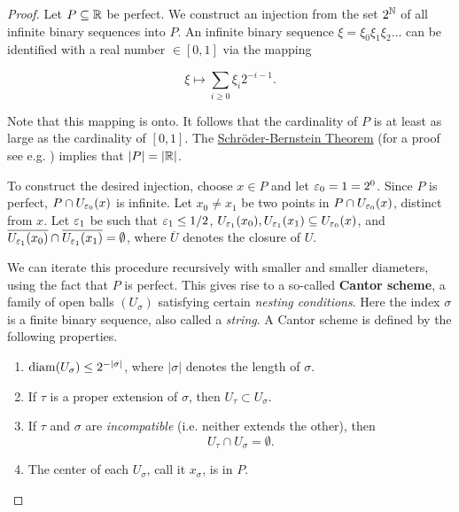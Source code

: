 \begin{proof}Let $P \subseteq \mathbb{R}$ be perfect. We construct an injection from the set $2^{\mathbb{N}}$ of all infinite binary sequences into $P$. An infinite binary sequence $\xi = \xi_0 \xi_1 \xi_2 \dots$ can be identified with a real number $\in [0,1]$ via the mapping

\begin{equation}
\xi \mapsto \sum_{i \geq 0} \xi_i 2^{-i-1}.
\end{equation}

Note that this mapping is onto. It follows that the cardinality of $P$ is at least as large as the cardinality of $[0,1]$. The \href{https://en.wikipedia.org/wiki/Schr\%C3\%B6der\%E2\%80\%93Bernstein\_theorem}{Schröder-Bernstein Theorem} (for a proof see e.g. \cite{jech2003a}) implies that $|P| = |\mathbb{R}|$.

To construct the desired injection, choose $x \in P$ and let $\varepsilon_0 = 1 = 2^0$. Since $P$ is perfect, $P \cap U_{\varepsilon_0}(x)$ is infinite. Let $x_0 \neq x_1$ be two points in $P \cap U_{\varepsilon_0}(x)$, distinct from $x$. Let $\varepsilon_1$ be such that $\varepsilon_1 \leq 1/2$, $U_{\varepsilon_1}(x_0), U_{\varepsilon_1}(x_1) \subseteq U_{\varepsilon_0}(x)$, and $\overline{U_{\varepsilon_1}(x_0)} \cap \overline{U_{\varepsilon_1}(x_1)} = \emptyset$, where $\overline{U}$ denotes the closure of $U$.

We can iterate this procedure recursively with smaller and smaller diameters, using the fact that $P$ is perfect. This gives rise to a so-called \textbf{Cantor scheme}, a family of open balls $(U_\sigma)$ satisfying certain \textit{nesting conditions}. Here the index $\sigma$ is a finite binary sequence, also called a \textit{string}. A Cantor scheme is defined by the following properties.

\begin{enumerate}
\item $\mathrm{diam}(U_\sigma) \leq 2^{ -|\sigma|}$, where $|\sigma|$ denotes the length of $\sigma$.
\item If $\tau$ is a proper extension of $\sigma$, then $U_\tau \subset U_\sigma$.
\item If $\tau$ and $\sigma$ are \textit{incompatible} (i.e. neither extends the other), then
\begin{equation*}
U_\tau \cap U_\sigma = \emptyset.
\end{equation*}

\item The center of each $U_\sigma$, call it $x_\sigma$, is in $P$.
\end{enumerate}


\end{proof}
